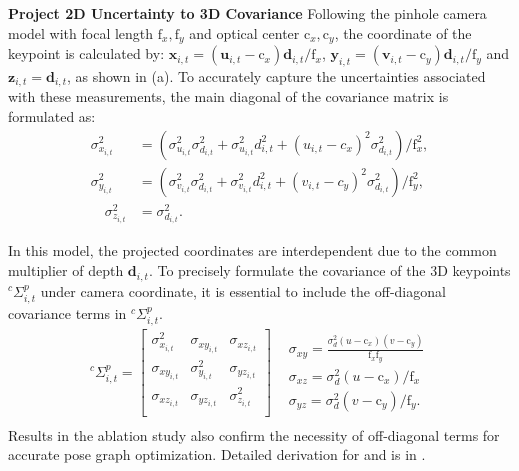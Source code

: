 \textbf{Project 2D Uncertainty to 3D Covariance}\;
Following the pinhole camera model with focal length $\mathrm{f}_x, \mathrm{f}_y$ and optical center $\mathrm{c}_x, \mathrm{c}_y$, the coordinate of the keypoint is calculated by: $\mathbf{x}_{i, t} = (\mathbf{u}_{i, t} - \mathrm{c}_x)\mathbf{d}_{i, t} / \mathrm{f}_x$, $\mathbf{y}_{i, t} = (\mathbf{v}_{i, t} - \mathrm{c}_y)\mathbf{d}_{i, t} / \mathrm{f}_y$ and $\mathbf{z}_{i, t} = \mathbf{d}_{i, t}$, as shown in   (a). To accurately capture the uncertainties associated with these measurements, the main diagonal of the covariance matrix is formulated as:
\begin{equation}
\label{eq: Variance terms}
\begin{aligned}
    \sigma_{x_{i, t}}^2 &= {\left(\sigma_{u_{i, t}}^2\sigma_{d_{i, t}}^2 + \sigma_{u_{i, t}}^2d_{i, t}^2 + (u_{i, t} - c_x)^2\sigma_{d_{i, t}}^2\right)}/{\mathrm{f}_x^2},\\
    \sigma_{y_{i, t}}^2 &= {\left(\sigma_{v_{i, t}}^2\sigma_{d_{i, t}}^2 + \sigma_{v_{i, t}}^2d_{i, t}^2 + (v_{i, t} - c_y)^2\sigma_{d_{i, t}}^2\right)}/{\mathrm{f}_y^2},\\
    \quad\sigma_{z_{i, t}}^2 &= \sigma_{d_{i, t}}^2.
\end{aligned}
\end{equation}

In this model, the projected coordinates are interdependent due to the common multiplier of depth $\mathbf{d}_{i,t}$.
To precisely formulate the covariance of the 3D keypoints ${}^c\Sigma_{i, t}^p$ under camera coordinate, it is essential to include the off-diagonal covariance terms in ${}^c\Sigma_{i, t}^p$.  
\begin{equation}
    \label{eq: Covariance terms}
    \begin{aligned}
        {}^c\Sigma_{i, t}^p = \begin{bmatrix}
            \sigma_{x_{i, t}}^2 & \sigma_{xy_{i, t}} & \sigma_{xz_{i, t}} \\
            \sigma_{xy_{i, t}} & \sigma_{y_{i, t}}^2 & \sigma_{yz_{i, t}} \\
            \sigma_{xz_{i, t}} & \sigma_{yz_{i, t}} & \sigma_{z_{i, t}}^2 \\
        \end{bmatrix}\begin{aligned}
            &\sigma_{xy} = \frac{\sigma_{d}^2 (u - \mathrm{c}_x) (v - \mathrm{c}_y)}{\mathrm{f}_x\mathrm{f}_y}\\
            &\sigma_{xz} = \sigma_{d}^2 (u - \mathrm{c}_x)/\mathrm{f}_x\\
            &\sigma_{yz} = \sigma_{d}^2 (v - \mathrm{c}_y)/\mathrm{f}_y.
        \end{aligned}\\
    \end{aligned}
\end{equation}
Results in the ablation study also confirm the necessity of off-diagonal terms for accurate pose graph optimization. Detailed derivation for  and  is in . 

